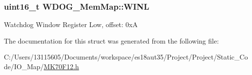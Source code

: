 \subsubsection[{W\+I\+N\+L}]{\setlength{\rightskip}{0pt plus 5cm}uint16\+\_\+t W\+D\+O\+G\+\_\+\+Mem\+Map\+::\+W\+I\+N\+L}\label{struct_w_d_o_g___mem_map_af238938251c1f5904a215c8a4ed1b74d}
Watchdog Window Register Low, offset\+: 0x\+A 

The documentation for this struct was generated from the following file\+:\begin{DoxyCompactItemize}
\item 
C\+:/\+Users/13115605/\+Documents/workspace/es18aut35/\+Project/\+Project/\+Static\+\_\+\+Code/\+I\+O\+\_\+\+Map/\hyperlink{_m_k70_f12_8h}{M\+K70\+F12.\+h}\end{DoxyCompactItemize}
